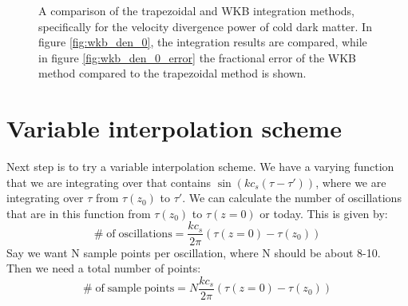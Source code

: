 \documentclass[superscriptaddress,prd]{revtex4}
\begin{document}
\begin{figure}[h!]
  \centering
  \caption{A comparison of the trapezoidal and WKB integration
    methods, specifically for the velocity divergence power of cold
    dark matter.  In figure \ref{fig:wkb_den_0}, the integration results
  are compared, while in figure \ref{fig:wkb_den_0_error} the fractional
error of the WKB method compared to the trapezoidal method is shown.}\label{fig:wkb_den}
\end{figure}

\section{Variable interpolation scheme}
Next step is to try a variable interpolation scheme.  We have a varying function that we
are integrating over that contains $\sin ( k c_s (\tau - \tau') )$,
where we are integrating over $\tau$ from $\tau(z_0)$ to $\tau'$.  We
can calculate the number of oscillations that are in this function
from $\tau(z_0)$ to $\tau(z=0)$ or today.  This is given by:
\begin{equation}
  \mathrm{\#\;of\;oscillations} = \frac{ k c_s}{2 \pi}
  (\tau(z=0)-\tau(z_0))
\end{equation}
Say we want N sample points per oscillation, where N should be about
8-10.  Then we need a total number of points:
\begin{equation}
  \mathrm{ \#\;of\;sample\;points} = N \frac{ k c_s } {2 \pi}
  (\tau(z=0)-\tau(z_0)) 
\end{equation}
\end{document}
